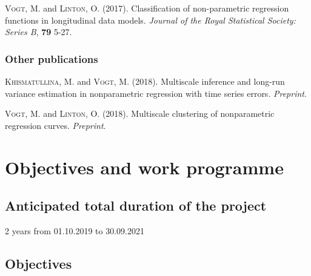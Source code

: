 \documentclass[a4paper,12pt]{article}
\begin{document}
\hangindent=0.4cm \textsc{Vogt}, M. and \textsc{Linton}, O. (2017). Classification of non-parametric regression functions in longitudinal data models. \textit{Journal of the Royal Statistical Society: Series B}, \textbf{79} 5-27.


\subsubsection{Other publications}

\hangindent=0.4cm \textsc{Khismatullina}, M. and \textsc{Vogt}, M. (2018). Multiscale inference and long-run variance estimation in nonparametric regression with time series errors. \textit{Preprint}.

\vspace{5pt}

\noindent \hangindent=0.4cm \textsc{Vogt}, M. and \textsc{Linton}, O. (2018). Multiscale clustering of nonparametric regression curves. \textit{Preprint}. 



\section{Objectives and work programme}


\subsection{Anticipated total duration of the project}


2 years from 01.10.2019 to 30.09.2021


\subsection{Objectives}
\end{document}
